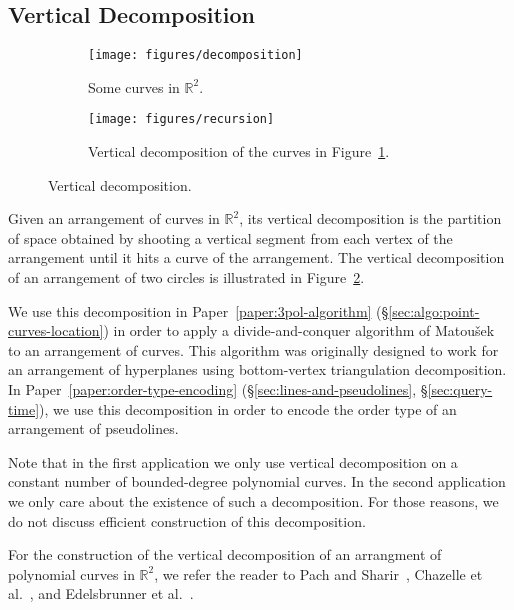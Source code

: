 \subsection{Vertical Decomposition}%
\label{sec:arrangements:vertical-decomposition}

\begin{figure}
	\centering{}
    \begin{subfigure}[t]{0.5\textwidth}
		\centering
		\texttt{[image: figures/decomposition]}
		\caption{Some curves in $\mathbb{R}^2$.}%
		\label{fig:some-curves-in-R2}
    \end{subfigure}%
    \begin{subfigure}[t]{0.5\textwidth}
		\centering
		\texttt{[image: figures/recursion]}
		\caption{Vertical decomposition of the curves in Figure~\ref{fig:some-curves-in-R2}.}%
    \end{subfigure}
	\caption{Vertical decomposition.}\label{fig:vd}
\end{figure}

Given an arrangement of curves in \(\mathbb{R}^2\), its vertical decomposition
is the partition of space obtained by shooting a vertical segment from each
vertex of the arrangement until it hits a curve of the arrangement. The
vertical decomposition of an arrangement of two circles is illustrated
in Figure~\ref{fig:vd}.

We use this decomposition in Paper~\ref{paper:3pol-algorithm}
(\S\ref{sec:algo:point-curves-location}) in order to apply a divide-and-conquer
algorithm of Matou{\v s}ek~\cite{Ma93} to an arrangement of curves.
This algorithm was originally designed to work for an arrangement of
hyperplanes using bottom-vertex triangulation decomposition.
%
In Paper~\ref{paper:order-type-encoding} (\S\ref{sec:lines-and-pseudolines},
\S\ref{sec:query-time}), we use this decomposition in order to
encode the order type of an arrangement of pseudolines.

Note that in the first application we only use vertical decomposition on a
constant number of bounded-degree polynomial curves.
%
In the second application we only care about the existence of such a
decomposition.
%
For those reasons, we do not discuss efficient construction of this
decomposition.

For the construction of the vertical decomposition of an arrangment of
polynomial curves in \(\mathbb{R}^2\),
we refer the reader to Pach and Sharir~\cite{Alcala}, Chazelle et
al.~\cite{CEGS91}, and Edelsbrunner et al.~\cite{EGPPSS92}.

